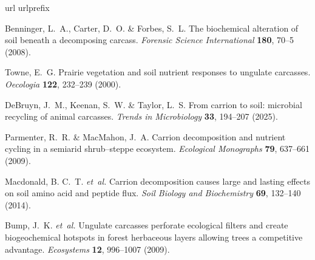 \documentclass[
  sn-nature,
  lineno, referee]{sn-jnl}
\begin{document}
\renewcommand{\bibsection}{}
\begin{thebibliography}{10}
  \expandafter\ifx\csname url\endcsname\relax
    \def\url#1{\burl{#1}}\fi
  \expandafter\ifx\csname urlprefix\endcsname\relax\def\urlprefix{URL }\fi
  \providecommand{\bibinfo}[2]{#2}
  \providecommand{\eprint}[2][]{\url{#2}}
  \providecommand{\doi}[1]{\url{https://doi.org/#1}}
  \bibcommenthead
  
  \bibinfo{author}{Benninger, L.~A.}, \bibinfo{author}{Carter, D.~O.} \& \bibinfo{author}{Forbes, S.~L.}
  \newblock \bibinfo{title}{The biochemical alteration of soil beneath a decomposing carcass}.
  \newblock \emph{\bibinfo{journal}{Forensic Science International}} \textbf{\bibinfo{volume}{180}}, \bibinfo{pages}{70--5} (\bibinfo{year}{2008}).
  
  \bibinfo{author}{Towne, E.~G.}
  \newblock \bibinfo{title}{Prairie vegetation and soil nutrient responses to ungulate carcasses}.
  \newblock \emph{\bibinfo{journal}{Oecologia}} \textbf{\bibinfo{volume}{122}}, \bibinfo{pages}{232--239} (\bibinfo{year}{2000}).
  
  \bibinfo{author}{DeBruyn, J.~M.}, \bibinfo{author}{Keenan, S.~W.} \& \bibinfo{author}{Taylor, L.~S.}
  \newblock \bibinfo{title}{From carrion to soil: microbial recycling of animal carcasses}.
  \newblock \emph{\bibinfo{journal}{Trends in Microbiology}} \textbf{\bibinfo{volume}{33}}, \bibinfo{pages}{194--207} (\bibinfo{year}{2025}).
  
  \bibinfo{author}{Parmenter, R.~R.} \& \bibinfo{author}{MacMahon, J.~A.}
  \newblock \bibinfo{title}{Carrion decomposition and nutrient cycling in a semiarid shrub–steppe ecosystem}.
  \newblock \emph{\bibinfo{journal}{Ecological Monographs}} \textbf{\bibinfo{volume}{79}}, \bibinfo{pages}{637--661} (\bibinfo{year}{2009}).
  
  \bibinfo{author}{Macdonald, B. C.~T.} \emph{et~al.}
  \newblock \bibinfo{title}{Carrion decomposition causes large and lasting effects on soil amino acid and peptide flux}.
  \newblock \emph{\bibinfo{journal}{Soil Biology and Biochemistry}} \textbf{\bibinfo{volume}{69}}, \bibinfo{pages}{132--140} (\bibinfo{year}{2014}).
  
  \bibinfo{author}{Bump, J.~K.} \emph{et~al.}
  \newblock \bibinfo{title}{Ungulate carcasses perforate ecological filters and create biogeochemical hotspots in forest herbaceous layers allowing trees a competitive advantage}.
  \newblock \emph{\bibinfo{journal}{Ecosystems}} \textbf{\bibinfo{volume}{12}}, \bibinfo{pages}{996--1007} (\bibinfo{year}{2009}).
  

\end{thebibliography}
\end{document}
